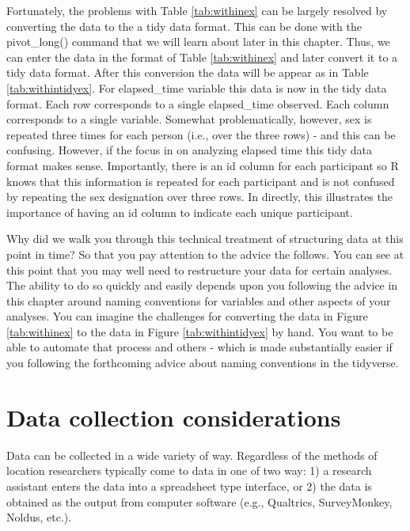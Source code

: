 \documentclass[
]{krantz}
\begin{document}
Fortunately, the problems with Table \ref{tab:withinex} can be largely resolved by converting the data to the a tidy data format. This can be done with the pivot\_long() command that we will learn about later in this chapter. Thus, we can enter the data in the format of Table \ref{tab:withinex} and later convert it to a tidy data format. After this conversion the data will be appear as in Table \ref{tab:withintidyex}. For elapsed\_time variable this data is now in the tidy data format. Each row corresponds to a single elapsed\_time observed. Each column corresponds to a single variable. Somewhat problematically, however, sex is repeated three times for each person (i.e., over the three rows) - and this can be confusing. However, if the focus in on analyzing elapsed time this tidy data format makes sense. Importantly, there is an id column for each participant so R knows that this information is repeated for each participant and is not confused by repeating the sex designation over three rows. In directly, this illustrates the importance of having an id column to indicate each unique participant.

Why did we walk you through this technical treatment of structuring data at this point in time? So that you pay attention to the advice the follows. You can see at this point that you may well need to restructure your data for certain analyses. The ability to do so quickly and easily depends upon you following the advice in this chapter around naming conventions for variables and other aspects of your analyses. You can imagine the challenges for converting the data in Figure \ref{tab:withinex} to the data in Figure \ref{tab:withintidyex} by hand. You want to be able to automate that process and others - which is made substantially easier if you following the forthcoming advice about naming conventions in the tidyverse.

\hypertarget{data-collection-considerations}{%
\section{Data collection considerations}\label{data-collection-considerations}}

Data can be collected in a wide variety of way. Regardless of the methods of location researchers typically come to data in one of two way: 1) a research assistant enters the data into a spreadsheet type interface, or 2) the data is obtained as the output from computer software (e.g., Qualtrics, SurveyMonkey, Noldus, etc.).
\end{document}
